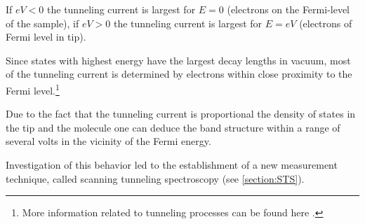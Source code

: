 \documentclass[
10pt,					%
a4paper,				%
twoside,				%
BCOR=8mm,				%
headings=normal,		%
headsepline,			%
footsepline,			%
plainfootsepline,		%
]{scrbook}
\begin{document}
If $eV<0$ the tunneling current is largest for $E=0$ (electrons on the Fermi-level of the sample), if $eV>0$ the tunneling current is largest for $E=eV$ (electrons of Fermi level in tip).

Since states with highest energy have the largest decay lengths in vacuum, most of the tunneling current is determined by electrons within close proximity to the Fermi level.\footnote{More information related to tunneling processes can be found here \cite{bonnell_scanning_1993}.}

Due to the fact that the tunneling current is proportional the density of states in the tip and the molecule one can deduce the band structure within a range of several volts in the vicinity of the Fermi energy.

Investigation of this behavior led to the establishment of a new measurement technique, called scanning tunneling spectroscopy (see \autoref{section:STS}). 
\end{document}
